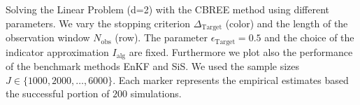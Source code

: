 Solving the Linear Problem (d=2) with the CBREE method using  different parameters. We vary the stopping criterion $\Delta_{\text{Target}}$ (color) and the length of the observation window $N_\text{obs}$ (row). The parameter $\epsilon_{\text{Target}} = 0.5$ and the choice of the indicator approximation $I_\text{alg}$ are fixed. Furthermore we plot also the performance of the benchmark methods EnKF and SiS. We used the sample sizes $J \in \{1000, 2000, \ldots, 6000\}$. Each marker represents the empirical estimates based the successful portion of $200$ simulations.